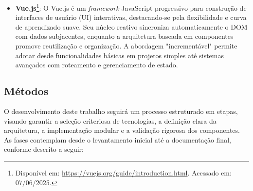 \begin{enumerate}
\begin{itemize}
            \item \textbf{Vue.js}\footnote{Disponível em: \url{https://vuejs.org/guide/introduction.html}. Acessado em: 07/06/2025.}: 
                O Vue.js é um \textit{framework} JavaScript progressivo para construção de interfaces de usuário (UI) interativas, destacando-se pela flexibilidade e curva de aprendizado suave. Seu núcleo reativo sincroniza automaticamente o DOM com dados subjacentes, enquanto a arquitetura baseada em componentes promove reutilização e organização. A abordagem "incrementável" permite adotar desde funcionalidades básicas em projetos simples até sistemas avançados com roteamento e gerenciamento de estado.
        \end{itemize}
    \end{enumerate}

\subsection{Métodos}
    O desenvolvimento deste trabalho seguirá um processo estruturado em etapas, visando garantir a seleção criteriosa de tecnologias, a definição clara da arquitetura, a implementação modular e a validação rigorosa dos componentes. As fases contemplam desde o levantamento inicial até a documentação final, conforme descrito a seguir:
    \par\vspace{0.5\baselineskip}
    

